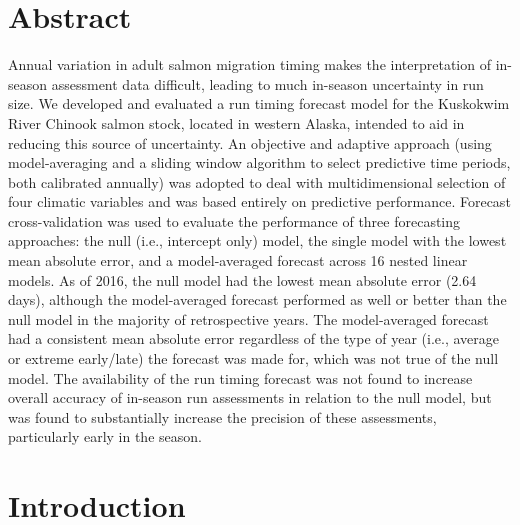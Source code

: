 \documentclass[12pt,]{book}
\theoremstyle{definition}
\theoremstyle{definition}
\theoremstyle{definition}
\theoremstyle{remark}
\begin{document}
\section*{Abstract}\label{abstract}

Annual variation in adult salmon migration timing makes the
interpretation of in-season assessment data difficult, leading to much
in-season uncertainty in run size. We developed and evaluated a run
timing forecast model for the Kuskokwim River Chinook salmon stock,
located in western Alaska, intended to aid in reducing this source of
uncertainty. An objective and adaptive approach (using model-averaging
and a sliding window algorithm to select predictive time periods, both
calibrated annually) was adopted to deal with multidimensional selection
of four climatic variables and was based entirely on predictive
performance. Forecast cross-validation was used to evaluate the
performance of three forecasting approaches: the null (i.e., intercept
only) model, the single model with the lowest mean absolute error, and a
model-averaged forecast across 16 nested linear models. As of 2016, the
null model had the lowest mean absolute error (2.64 days), although the
model-averaged forecast performed as well or better than the null model
in the majority of retrospective years. The model-averaged forecast had
a consistent mean absolute error regardless of the type of year (i.e.,
average or extreme early/late) the forecast was made for, which was not
true of the null model. The availability of the run timing forecast was
not found to increase overall accuracy of in-season run assessments in
relation to the null model, but was found to substantially increase the
precision of these assessments, particularly early in the season.

\section{Introduction}\label{introduction}
\end{document}
